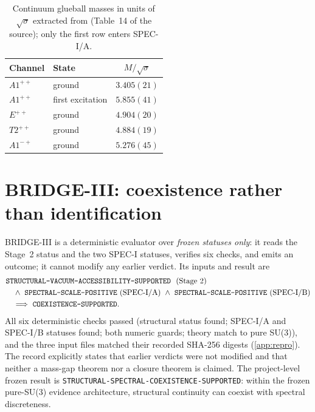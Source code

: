 \documentclass[11pt,a4paper]{article}
\theoremstyle{definition}
\theoremstyle{remark}
\newcommand{\sqs}{\sqrt{\sigma}}
\begin{document}
\begin{table}[t]
\centering\small
\caption{Continuum glueball masses in units of $\sqs$ extracted from \cite{AT20} (Table~14 of the source); only the first row enters SPEC-I/A.}\label{tab:cont}
\begin{tabular}{@{}llc@{}}\toprule Channel & State & $M/\sqs$\\\midrule
$A1^{++}$ & ground & $3.405(21)$\\
$A1^{++}$ & first excitation & $5.855(41)$\\
$E^{++}$ & ground & $4.904(20)$\\
$T2^{++}$ & ground & $4.884(19)$\\
$A1^{-+}$ & ground & $5.276(45)$\\
\bottomrule\end{tabular}
\end{table}

\section{BRIDGE-III: coexistence rather than identification}\label{sec:bridge}

BRIDGE-III is a deterministic evaluator over \emph{frozen statuses only}: it reads the Stage~2 status and the two SPEC-I statuses, verifies six checks, and emits an outcome; it cannot modify any earlier verdict. Its inputs and result are
\[
\begin{aligned}
&\texttt{STRUCTURAL-\allowbreak{}VACUUM-\allowbreak{}ACCESSIBILITY-\allowbreak{}SUPPORTED}\ \ (\text{Stage 2})\\
&\quad\wedge\ \texttt{SPECTRAL-\allowbreak{}SCALE-\allowbreak{}POSITIVE}\ (\text{SPEC-I/A})\ \wedge\ \texttt{SPECTRAL-\allowbreak{}SCALE-\allowbreak{}POSITIVE}\ (\text{SPEC-I/B})\\
&\quad\Longrightarrow\ \texttt{COEXISTENCE-\allowbreak{}SUPPORTED}.
\end{aligned}
\]
All six deterministic checks passed (structural status found; SPEC-I/A and SPEC-I/B statuses found; both numeric guards; theory match to pure SU(3)), and the three input files matched their recorded SHA-256 digests (\cref{app:repro}). The record explicitly states that earlier verdicts were not modified and that neither a mass-gap theorem nor a closure theorem is claimed. The project-level frozen result is \texttt{STRUCTURAL-\allowbreak{}SPECTRAL-\allowbreak{}COEXISTENCE-\allowbreak{}SUPPORTED}: within the frozen pure-SU(3) evidence architecture, structural continuity can coexist with spectral discreteness.
\end{document}
